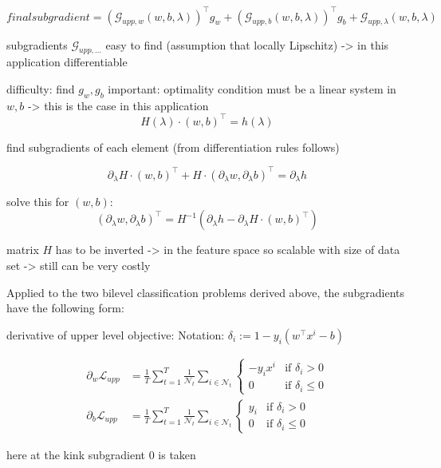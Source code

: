 \[ final subgradient = \left(\mathcal{G}_{upp,w}(w,b,\lambda)\right)^{\top}g_w+\left(\mathcal{G}_{upp,b}(w,b,\lambda)\right)^{\top}g_b+\mathcal{G}_{upp,\lambda}(w,b,\lambda) 
\label{subgr_upp}\]

subgradients \(\mathcal{G}_{upp,...}\) easy to find (assumption that locally Lipschitz) -> in this application differentiable

difficulty: find \(g_w, g_b\)
important: optimality condition must be a linear system in \(w,b\) -> this is the case in this application
\[ H(\lambda)\cdot (w,b)^{\top} = h(\lambda) \]

find subgradients of each element (from differentiation rules follows)

\[ \partial_{\lambda} H\cdot (w,b)^{\top} + H \cdot(\partial_{\lambda} w, \partial_{\lambda} b)^{\top} = \partial_{\lambda} h  \]

solve this for \((w,b)\):
\[ (\partial_{\lambda} w, \partial_{\lambda}b)^{\top} = H^{-1}\left(\partial_{\lambda}h-\partial_{\lambda} H \cdot(w,b)^{\top}\right) \]

matrix \(H\) has to be inverted -> in the feature space so scalable with size of data set -> still can be very costly \cite{Moore2011}

Applied to the two bilevel classification problems derived above, the subgradients have the following form:

derivative of upper level objective:
Notation: \(\delta_i := 1-y_i(w^{\top}x^i-b)\)

\begin{align}
	\partial_{w}\mathcal{L}_{upp}&= \frac{1}{T}\sum_{t=1}^T\frac{1}{\mathcal{N}_t}\sum_{i \in \mathcal{N}_t}{\left\{\begin{array}{cl} -y_ix^i & \text{if } \delta_i >0 \\ 0 & \text{if } \delta_i \leq 0 \end{array} \right.} \\
	\partial_{b}\mathcal{L}_{upp}&= \frac{1}{T}\sum_{t=1}^T\frac{1}{\mathcal{N}_t}\sum_{i \in \mathcal{N}_t}{\left\{\begin{array}{cl} y_i & \text{if } \delta_i >0 \\ 0 & \text{if } \delta_i \leq 0 \end{array} \right.}
	\end{align}
	
	here at the kink subgradient 0 is taken

